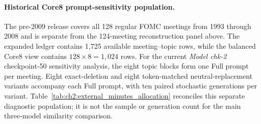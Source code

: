 \paragraph*{Historical Core8 prompt-sensitivity population.}
The pre-2009 release covers all 128 regular FOMC meetings from 1993 through
2008 and is separate from the 124-meeting reconstruction panel above. The
expanded ledger contains 1,725 available meeting--topic rows, while the
balanced Core8 view contains $128\times8=1,024$ rows. For the current
\textit{Model chk-2} checkpoint-50 sensitivity analysis, the eight topic
blocks form one Full prompt per meeting. Eight exact-deletion and eight
token-matched neutral-replacement variants accompany each Full prompt, with
ten paired stochastic generations per variant. Table~\ref{tab:ch2:external_minutes_allocation}
reconciles this separate diagnostic population; it is not the sample or
generation count for the main three-model similarity comparison.

